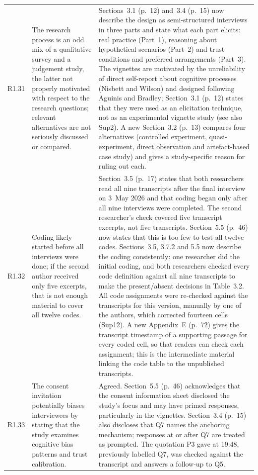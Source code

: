 \documentclass[12pt,a4paper,twoside]{article}
\begin{document}
{\begin{longtable}{p{1cm}p{6.7cm}p{7cm}}
R1.31 &
The research process is an odd mix of a qualitative survey and a judgement study, the latter not properly motivated with respect to the research questions; relevant alternatives are not seriously discussed or compared. &
Sections~3.1 (p.~12) and~3.4 (p.~15) now describe the design as semi-structured interviews in three parts and state what each part elicits: real practice (Part~1), reasoning about hypothetical scenarios (Part~2) and trust conditions and preferred arrangements (Part~3). The vignettes are motivated by the unreliability of direct self-report about cognitive processes (Nisbett and Wilson) and designed following Aguinis and Bradley; Section~3.1 (p.~12) states that they were used as an elicitation technique, not as an experimental vignette study (see also Sup2). A new Section~3.2 (p.~13) compares four alternatives (controlled experiment, quasi-experiment, direct observation and artefact-based case study) and gives a study-specific reason for ruling out each. \\

R1.32 &
Coding likely started before all interviews were done; if the second author received only five excerpts, that is not enough material to cover all twelve codes. &
Section~3.5 (p.~17) states that both researchers read all nine transcripts after the final interview on 3~May 2026 and that coding began only after all nine interviews were completed. The second researcher's check covered five transcript excerpts, not five transcripts. Section~5.5 (p.~46) now states that this is too few to test all twelve codes. Sections~3.5, 3.7.2 and 5.5 now describe the coding consistently: one researcher did the initial coding, and both researchers checked every code definition against all nine transcripts to make the present/absent decisions in Table~3.2. All code assignments were re-checked against the transcripts for this version, manually by one of the authors, which corrected fourteen cells (Sup12). A new Appendix~E (p.~72) gives the transcript timestamp of a supporting passage for every coded cell, so that readers can check each assignment; this is the intermediate material linking the code table to the unpublished transcripts. \\

R1.33 &
The consent invitation potentially biases interviewees by stating that the study examines cognitive bias patterns and trust calibration. &
Agreed. Section~5.5 (p.~46) acknowledges that the consent information sheet disclosed the study's focus and may have primed responses, particularly in the vignettes. Section~3.4 (p.~15) also discloses that Q7 names the anchoring mechanism; responses at or after Q7 are treated as prompted. The quotation P3 gave at 19:48, previously labelled Q7, was checked against the transcript and answers a follow-up to Q5. \\


\end{longtable}}
\end{document}
